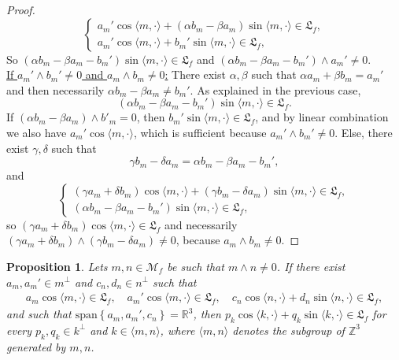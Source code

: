 \documentclass[10pt]{article}
\newcommand{\R}{{\mathbb R}}
\newcommand{\Z}{{\mathbb Z}}
\newcommand{\M}{{\mathcal M}}
\newcommand{\la}{\langle}
\newcommand{\ra}{\rangle}
\newcommand{\we}{\wedge}
\newtheorem{prop}{Proposition}
\begin{document}
\begin{proof}
    \begin{equation}
        \left\{\begin{array}{ll}
             a_m'\cos \la m,\cdot \ra + (\alpha b_m -\beta a_m)\sin \la m,\cdot \ra \in \mathfrak{L}_f, \\
              a_m'\cos \la m,\cdot \ra +b_m'\sin \la m,\cdot \ra \in \mathfrak{L}_f,
        \end{array}\right.
    \end{equation}
    So $(\alpha b_m-\beta a_m -b_m')
    \sin \la m,\cdot \ra\in \mathfrak{L}_f$ and $(\alpha b_m -\beta a_m -b_m')\we a_m' \neq 0$. \\
    \underline{If $a_m'\we b_m'\neq0$ and $a_m \we b_m \neq 0$:} There exist $\alpha,\beta$ such that $\alpha a_m+\beta b_m =a_m'$ and then necessarily $\alpha b_m -\beta a_m \neq b_m'$. As explained in the previous case, 
    \begin{equation*}
        (\alpha b_m -\beta a_m -b_m')\sin \la m,\cdot \ra \in \mathfrak{L}_f.
    \end{equation*}
    If $(\alpha b_m-\beta a_m)\we b'_m=0$, then $b_m' \sin \la m,\cdot \ra \in \mathfrak{L}_f$, and by linear combination we also have $a_m'\cos \la m,\cdot \ra$, which is sufficient because $a_m'\we b_m' \neq 0$. Else, there exist $\gamma,\delta$ such that 
    \begin{equation*}
         \gamma b_m-\delta a_m=\alpha b_m-\beta a_m -b_m',
    \end{equation*}
    and 
    \begin{equation*}
        \left\{\begin{array}{ll}
             (\gamma a_m+\delta b_m)\cos \la m,\cdot \ra + (\gamma b_m-\delta a_m)\sin \la m,\cdot \ra \in \mathfrak{L}_f, \\
              (\alpha b_m-\beta a_m -b_m')\sin \la m,\cdot \ra \in \mathfrak{L}_f,
        \end{array}\right.
    \end{equation*}
    so $(\gamma a_m +\delta b_m)\cos \la m,\cdot \ra\in \mathfrak{L}_f$ and necessarily $(\gamma a_m+\delta b_m)\we (\gamma b_m -\delta a_m)\neq 0$, because $a_m \we b_m \neq 0$. 
    \end{proof}

\begin{prop} \label{generation of modes : from 2 non colinear modes}
    Lets $m,n\in \M_f$ be such that $m\we n \neq 0$. If there exist $a_m,a_m'\in m^{\perp}$ and $c_n,d_n \in n^{\perp}$ such that 
    \begin{align*}
        a_m\cos \la m,\cdot \ra \in \mathfrak{L}_f, \quad a_m'\cos \la m,\cdot \ra \in \mathfrak{L}_f, \quad
        c_n \cos \la n,\cdot \ra +d_n \sin \la n,\cdot \ra \in \mathfrak{L}_f,
    \end{align*}
    and such that $\mathrm{span}\left\{a_m,a_m',c_n\right\}=\R^3$, then $p_k\cos\la k,\cdot \ra + q_k\sin \la k,\cdot \ra \in \mathfrak{L}_f$ for every $p_k,q_k \in k^{\perp}$ and $k \in \la m,n\ra$, where $\la m,n\ra$ denotes the subgroup of $\Z^3$ generated by $m,n$.
\end{prop}
\end{document}
